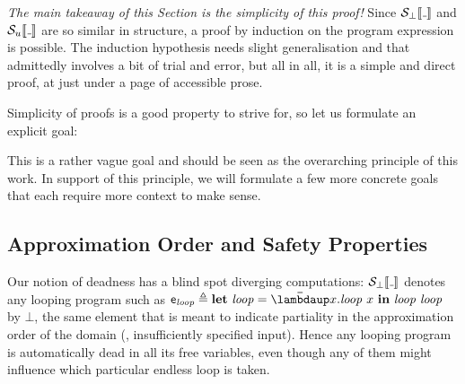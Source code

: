 \emph{The main takeaway of this Section is the simplicity of this proof!}
Since $\semscott{\wild}$ and $\semusg{\wild}$ are so similar in structure,
a proof by induction on the program expression is possible.
The induction hypothesis needs slight generalisation and that admittedly
involves a bit of trial and error, but all in all, it is a simple and direct
proof, at just under a page of accessible prose.

Simplicity of proofs is a good property to strive for, so let us formulate an
explicit goal:



This is a rather vague goal and should be seen as the overarching principle of
this work.
In support of this principle, we will formulate a few more concrete goals that
each require more context to make sense.


\subsection{Approximation Order and Safety Properties}
\label{sec:continuity}

Our notion of deadness has a blind spot \wrt diverging computations:
$\semscott{\wild}$ denotes any looping program such as
$\pe_{\mathit{loop}} \triangleq \Let{\mathit{loop}}{\Lam{x}{\mathit{loop}~x}}{{\mathit{loop}~\mathit{loop}}}$ by $\bot$, the
same element that is meant to indicate partiality in the approximation order
of the domain (\eg, insufficiently specified input).
Hence any looping program is automatically dead in all its free variables, even
though any of them might influence which particular endless loop is taken.


